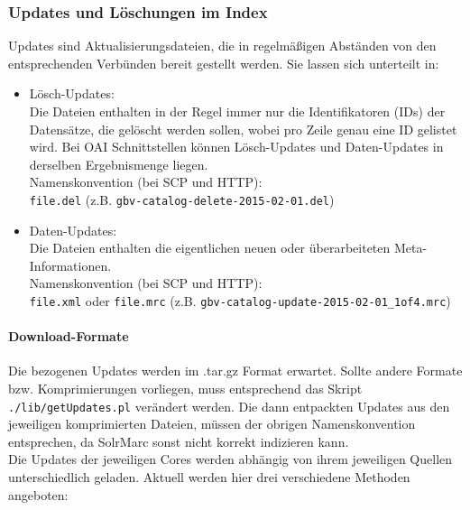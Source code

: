 \documentclass[10pt]{article}
\begin{document}
\subsubsection{Updates und Löschungen im Index}
\label{sec:subsub:Updates}
Updates sind Aktualisierungsdateien, die in regelmäßigen Abständen von den entsprechenden Verbünden bereit gestellt werden. Sie lassen sich unterteilt in: 
\begin{itemize}
	\item Lösch-Updates: \\
		Die Dateien enthalten in der Regel immer nur die Identifikatoren (IDs) der Datensätze, die gelöscht werden sollen, wobei pro Zeile genau eine ID gelistet wird. Bei OAI Schnittstellen können Lösch-Updates und Daten-Updates in derselben Ergebnismenge liegen. \\
		Namenskonvention (bei SCP und HTTP): \\
		\texttt{file.del} (z.B. \texttt{gbv-catalog-delete-2015-02-01.del})
	\item Daten-Updates: \\
		Die Dateien enthalten die eigentlichen neuen oder überarbeiteten Meta-Informationen. \\
		Namenskonvention (bei SCP und HTTP):\\
		\texttt{file.xml} oder \texttt{file.mrc} (z.B. \texttt{gbv-catalog-update-2015-02-01\_1of4.mrc})
\end{itemize}

\paragraph{Download-Formate}
Die bezogenen Updates werden im .tar.gz Format erwartet. Sollte andere Formate bzw. Komprimierungen vorliegen, muss entsprechend das Skript \texttt{./lib/getUpdates.pl} verändert werden. Die dann entpackten Updates aus den jeweiligen komprimierten Dateien, müssen der obrigen Namenskonvention entsprechen, da SolrMarc sonst nicht korrekt indizieren kann. \\
Die Updates der jeweiligen Cores werden abhängig von ihrem jeweiligen Quellen unterschiedlich geladen. Aktuell werden hier drei verschiedene Methoden angeboten: 
\end{document}
